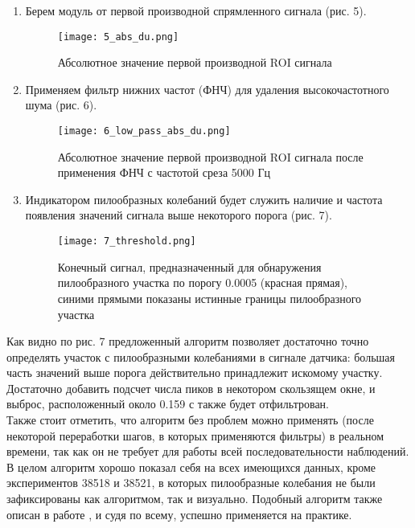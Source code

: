 \documentclass{report}
\begin{document}
\begin{enumerate}
\begin{figure}[H]
    \end{figure}
    \item Берем модуль от первой производной спрямленного сигнала (рис. 5).
    \begin{figure}[H]
         \centering
         \captionsetup{justification=centering}
         \texttt{[image: 5\_abs\_du.png]}
         \caption{Абсолютное значение первой производной ROI сигнала}\label{Fig:Data1}
    \end{figure}
    \item Применяем фильтр нижних частот (ФНЧ) для удаления высокочастотного шума (рис. 6).
    \begin{figure}[H]
         \centering
         \captionsetup{justification=centering}
         \texttt{[image: 6\_low\_pass\_abs\_du.png]}
         \caption{Абсолютное значение первой производной ROI сигнала после применения ФНЧ с частотой среза 5000 Гц}\label{Fig:Data1}
    \end{figure}
    \item Индикатором пилообразных колебаний будет служить наличие и частота появления значений сигнала выше некоторого порога (рис. 7).
    \begin{figure}[H]
         \centering
         \captionsetup{justification=centering}
         \texttt{[image: 7\_threshold.png]}
         \caption{Конечный сигнал, предназначенный для обнаружения пилообразного участка по порогу 0.0005 (красная прямая), синими прямыми показаны истинные границы пилообразного участка}\label{Fig:Data1}
    \end{figure}
\end{enumerate}

Как видно по рис. 7 предложенный алгоритм позволяет достаточно точно определять участок с пилообразными колебаниями в сигнале датчика: большая часть значений выше порога действительно принадлежит искомому участку. Достаточно добавить подсчет числа пиков в некотором скользящем окне, и выброс, расположенный около 0.159 с также будет отфильтрован.
\\

Также стоит отметить, что алгоритм без проблем можно применять (после некоторой переработки шагов, в которых применяются фильтры) в реальном времени, так как он не требует для работы всей последовательности наблюдений.
\\

В целом алгоритм хорошо показал себя на всех имеющихся данных, кроме экспериментов 38518 и 38521, в которых пилообразные колебания не были зафиксированы как алгоритмом, так и визуально. Подобный алгоритм также описан в работе \cite{paper2}, и судя по всему, успешно применяется на практике.
\\
\end{document}
